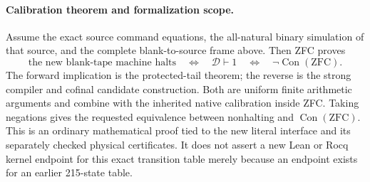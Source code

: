 \paragraph{Calibration theorem and formalization scope.}
Assume the exact source command equations, the all-natural binary
simulation of that source, and the complete blank-to-source frame above.
Then ZFC proves
\[
 \text{the new blank-tape machine halts}
 \quad\Longleftrightarrow\quad
 \mathcal D\vdash1
 \quad\Longleftrightarrow\quad
 \neg\operatorname{Con}(\mathrm{ZFC}).
\]
The forward implication is the protected-tail theorem; the reverse is
the strong compiler and cofinal candidate construction.  Both are uniform
finite arithmetic arguments and combine with the inherited native
calibration inside ZFC.  Taking negations gives the requested equivalence
between nonhalting and $\operatorname{Con}(\mathrm{ZFC})$.
This is an ordinary mathematical proof tied to the new literal interface
and its separately checked physical certificates.  It does not assert a
new Lean or Rocq kernel endpoint for this exact transition table merely
because an endpoint exists for an earlier 215-state table.
